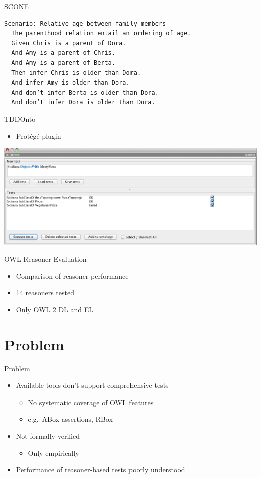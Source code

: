\documentclass[17pt,mathserif]{beamer}
\begin{document}
\begin{frame}[fragile]{SCONE}
  \begin{lstlisting}[basicstyle=\footnotesize\ttfamily]
Scenario: Relative age between family members
  The parenthood relation entail an ordering of age.
  Given Chris is a parent of Dora.
  And Amy is a parent of Chris.
  And Amy is a parent of Berta.
  Then infer Chris is older than Dora.
  And infer Amy is older than Dora.
  And don’t infer Berta is older than Dora.
  And don’t infer Dora is older than Dora.
  \end{lstlisting}
\end{frame}

\begin{frame}{TDDOnto}
  \begin{itemize}
    \item Prot\'eg\'e plugin
  \end{itemize}
  \includegraphics[width=\textwidth]{tddonto}
\end{frame}

\begin{frame}{OWL Reasoner Evaluation}
  \begin{itemize}
    \item Comparison of reasoner performance
    \item 14 reasoners tested
    \item Only OWL 2 DL and EL
  \end{itemize}
\end{frame}

\section{Problem}

\begin{frame}{Problem}
  \begin{itemize}
    \item Available tools don't support comprehensive tests
    \begin{itemize}
      \item No systematic coverage of OWL features
      \item e.g.\ ABox assertions, RBox
    \end{itemize}
    \item Not formally verified
    \begin{itemize}
      \item Only empirically
    \end{itemize}
    \item Performance of reasoner-based tests poorly understood
  \end{itemize}
\end{frame}
\end{document}
